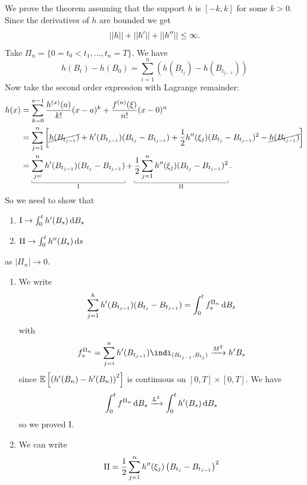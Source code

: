 \documentclass[12pt]{report}
\begin{document}
\begin{fancyproof}
	We prove the theorem assuming that the support $h$ is $[-k,k]$ for some $k>0$. Since the derivatives of $h$ are bounded we get
	\begin{equation*}
		\left|\left|h\right|\right|+\left|\left|h'\right|\right|+\left|\left|h''\right|\right|\leq\infty.
	\end{equation*}
	Take $\Pi_{n}=\{0=t_{0}<t_{1},\ldots,t_{n}=T\}$. We have
	\begin{equation*}
		h(B_{t})-h(B_{0})=\sum_{i=1}^{n}\left(h(B_{t_{j}})-h(B_{t_{j-1}})\right)
	\end{equation*}
Now take the second order expression with Lagrange remainder:
\begin{align*}
	h(x)&=\sum_{k=0}^{n-1}\frac{h^{(x)}(a)}{k!}(x-a)^{k}+\frac{f^{(n)}(\xi)}{n!}(x-0)^{n}\\
	&=\sum_{j=1}^{n}\left[\cancel{h(B_{t_{j-1}})}+h'(B_{t_{j-1}})(B_{t_{j}}-B_{t_{j-1}})+\unmezz h''(\xi_{j})(B_{t_{j}}-B_{t_{j-1}})^{2}-\cancel{h(B_{t_{j-1}})}\right]\\
	&=\ubracketthin{\sum_{j=}^{n}h'(B_{t_{j-1}})(B_{t_{j}}-B_{t_{j-1}})}_{\mathrm{I}}+\ubracketthin{\unmezz\sum_{j=1}^{n}h''(\xi_{j})(B_{t_{j}}-B_{t_{j-1}})^{2}}_{\mathrm{II}}.
\end{align*}
So we need to show that 
\begin{enumerate}
	\item $\mathrm{I}\to\int_{0}^{t}h'(B_{s})\mathop{}\!\mathrm{d} B_{s}$
	\item $\mathrm{II}\to\int_{0}^{t}h''(B_{s})\mathop{}\!\mathrm{d} s$
\end{enumerate}
as $|\Pi_{n}|\to0$.
\begin{enumerate}
	\item We write
	\begin{equation*}
		\sum_{j=1}^{h}h'(B_{t_{j-1}})(B_{t_{j}}-B_{t_{j-1}})=\int_{0}^{t}f_{s}^{\Pi_{n}}\mathop{}\!\mathrm{d} B_{s}
	\end{equation*}
	with
	\begin{equation*}
		f^{\Pi_{n}}_{s}=\sum_{j=i}^{n}h'(B_{t_{j-1}})\indi_{(B_{t_{j-1}},B_{t_{j}})}\xrightarrow{M^{2}}h'B_{s}
	\end{equation*}
	since $\mathbb{E}\left[\left(h'(B_{n})-h'(B_{n})\right)^{2}\right]$ is continuous on $[0,T]\times[0,T]$. We have
	\begin{equation*}
		\int_{0}^{t}f^{\Pi_{n}}\mathop{}\!\mathrm{d} B_{s}\xrightarrow{L^{2}}\int_{0}^{t}h'(B_{s})\mathop{}\!\mathrm{d} B_{s}
	\end{equation*}
	so we proved $\mathrm{I}$.
	\item We can write
	\begin{align*}
		\mathrm{II}&=\unmezz\sum_{j=1}^{n}h''(\xi_{j})\left(B_{t_{j}}-B_{t_{j-1}}\right)^{2}\\

\end{align*}
\end{enumerate}
\end{fancyproof}
\end{document}
